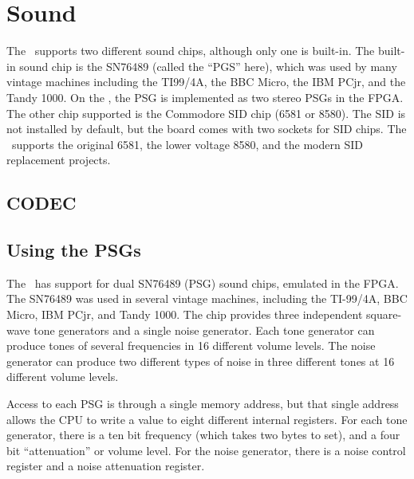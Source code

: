 \chapter{Sound}

The \jr\ supports two different sound chips, although only one is built-in. The built-in sound chip is the SN76489 (called the ``PGS'' here), which was used by many vintage machines including the TI99/4A, the BBC Micro, the IBM PCjr, and the Tandy 1000. On the \jr, the PSG is implemented as two stereo PSGs in the FPGA. The other chip supported is the Commodore SID chip (6581 or 8580). The SID is not installed by default, but the board comes with two sockets for SID chips. The \jr\ supports the original 6581, the lower voltage 8580, and the modern SID replacement projects.

\section{CODEC}

\section{Using the PSGs}

The \jr\ has support for dual SN76489 (PSG) sound chips, emulated in the FPGA. The SN76489 was used in several vintage machines, including the TI-99/4A, BBC Micro, IBM PCjr, and Tandy 1000. The chip provides three independent square-wave tone generators and a single noise generator. Each tone generator can produce tones of several frequencies in 16 different volume levels. The noise generator can produce two different types of noise in three different tones at 16 different volume levels.

Access to each PSG is through a single memory address, but that single address allows the CPU to write a value to eight different internal registers. For each tone generator, there is a ten bit frequency (which takes two bytes to set), and a four bit ``attenuation'' or volume level. For the noise generator, there is a noise control register and a noise attenuation register.

